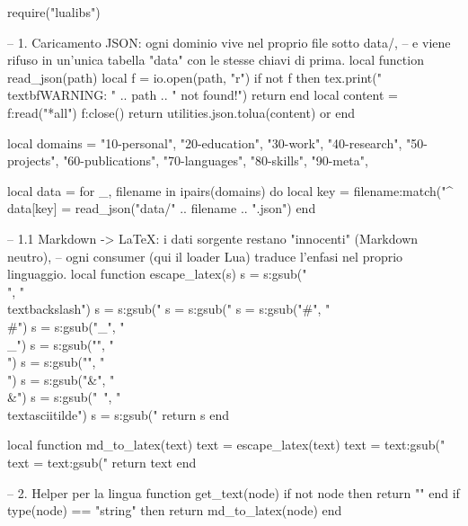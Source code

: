 \usepackage{luacode}
\usepackage{calligra}

\begin{luacode*}
    require("lualibs")

    -- 1. Caricamento JSON: ogni dominio vive nel proprio file sotto data/,
    --    e viene rifuso in un'unica tabella "data" con le stesse chiavi di prima.
    local function read_json(path)
    local f = io.open(path, "r")
    if not f then
    tex.print("\\textbf{WARNING: " .. path .. " not found!}")
    return {}
    end
    local content = f:read("*all")
    f:close()
    return utilities.json.tolua(content) or {}
    end

    local domains = {
    "10-personal", "20-education", "30-work", "40-research",
    "50-projects", "60-publications", "70-languages", "80-skills", "90-meta",
    }

    local data = {}
    for _, filename in ipairs(domains) do
    local key = filename:match("^%
    data[key] = read_json("data/" .. filename .. ".json")
    end

    -- 1.1 Markdown -> LaTeX: i dati sorgente restano "innocenti" (Markdown neutro),
    -- ogni consumer (qui il loader Lua) traduce l'enfasi nel proprio linguaggio.
    local function escape_latex(s)
    s = s:gsub("\\", "\\textbackslash{}")
    s = s:gsub("%
    s = s:gsub("%
    s = s:gsub("#", "\\#")
    s = s:gsub("_", "\\_")
    s = s:gsub("{", "\\{")
    s = s:gsub("}", "\\}")
    s = s:gsub("&", "\\&")
    s = s:gsub("~", "\\textasciitilde{}")
    s = s:gsub("%
    return s
    end

    local function md_to_latex(text)
    text = escape_latex(text)
    text = text:gsub("%
    text = text:gsub("%
    return text
    end

    -- 2. Helper per la lingua
    function get_text(node)
    if not node then return "" end
    if type(node) == "string" then return md_to_latex(node) end


\end{luacode*}
